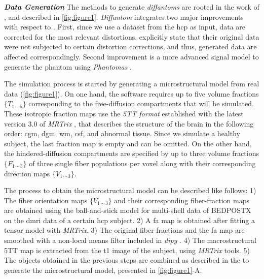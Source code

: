 \documentclass[english]{frontiers/frontiersSCNS} %
\begin{document}
\noindent\textbf{\textit{Data Generation\textcolon}\label{sec:data_generation}}
The methods to generate \emph{diffantoms} are rooted in the work of \cite{wilkins_fiber_2014}, and
  described in \autoref{fig:figure1}.
\emph{Diffantom} integrates two major improvements with respect to \citep{wilkins_fiber_2014}.
First, since we use a dataset from the \gls*{hcp} as input, data are corrected for the most relevant distortions.
\cite{wilkins_fiber_2014} explicitly state that their original data were not subjected to certain distortion
  corrections, and thus, generated data are affected correspondingly.
Second improvement is a more advanced signal model to generate the phantom using
  \emph{Phantomas} \citep{caruyer_Phantomas_2014}.

The simulation process is started by generating a microstructural model from real data (\autoref{fig:figure1}).
On one hand, the software requires up to five volume fractions $\{T_{1\,\cdots\,5}\}$ corresponding to the free-diffusion
  compartments that will be simulated.
These isotropic fraction maps use the \emph{5TT format} established with the latest version 3.0 of
  \emph{MRTrix} \citep{tournier_mrtrix_2012}, that describes the structure of the brain in the following
  order: \gls*{cgm}, \gls*{dgm}, \gls*{wm}, \gls*{csf}, and abnormal tissue.
Since we simulate a healthy subject, the last fraction map is empty and can be omitted.
On the other hand, the hindered-diffusion compartments are specified by up to three volume fractions $\{F_{1\,\cdots\,3}\}$
  of three single fiber populations per voxel along with their corresponding direction maps $\{V_{1\,\cdots\,3}\}$.

The process to obtain the microstructural model can be described like follows:
1) The fiber orientation maps $\{V_{1\,\cdots\,3}\}$ and their corresponding fiber-fraction maps are
  obtained using the ball-and-stick model for multi-shell data of BEDPOSTX \citep{jbabdi_modelbased_2012}
  on the \gls*{dmri} data of a certain \gls*{hcp} subject.
2) A \gls*{fa} map is obtained after fitting a tensor model with \emph{MRTrix}.
3) The original fiber-fractions and the \gls*{fa} map are smoothed with a non-local means filter included
  in \emph{dipy} \citep{garyfallis_dipy_2011}.
4) The macrostructural 5TT map is extracted from the \acrlong*{t1} image of the subject, using \emph{MRTrix} tools.
5) The objects obtained in the previous steps are combined as described in the  to generate the
  microstructural model, presented in \autoref{fig:figure1}-A.
\end{document}
